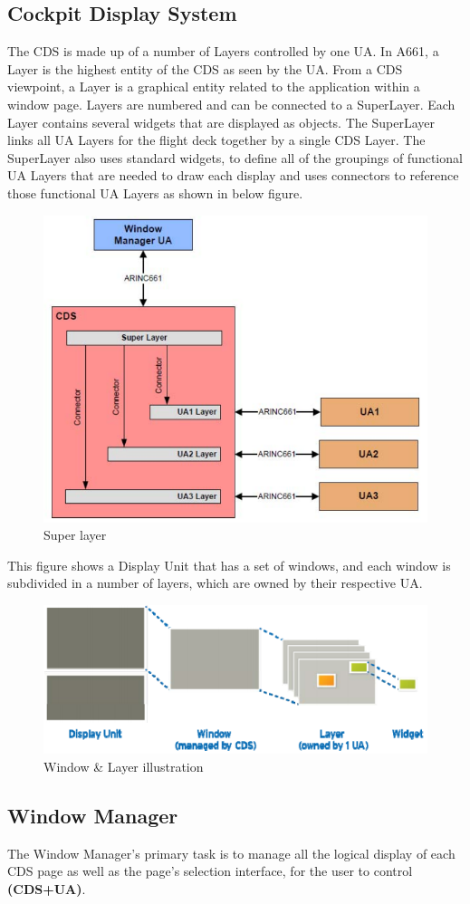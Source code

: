     \subsection{Cockpit Display System}
        The CDS is made up of a number of Layers controlled by one UA. In A661, a Layer is the highest entity of the CDS as seen by 
        the UA. From a CDS viewpoint, a Layer is a graphical entity related to the application within a window page. Layers are numbered 
        and can be connected to a SuperLayer. Each Layer contains several widgets that are displayed as objects. The SuperLayer links all 
        UA Layers for the flight deck together by a single CDS Layer. The SuperLayer also uses standard widgets, to define all of the 
        groupings of functional UA Layers that are needed to draw each display and uses connectors to reference those functional UA 
        Layers as shown in below figure.
        \begin{figure}[H]
            \centering
            \includegraphics[width=0.6\linewidth]{img/SuperLayer.PNG}
            \caption{Super layer}
        \end{figure}
        This figure shows a Display Unit that has a set of windows, and each window is subdivided in a number of layers, which are owned 
        by their respective UA.
        \begin{figure}[H]
            \centering
            \includegraphics[width=0.6\linewidth]{img/window-layer.PNG}
            \caption{Window \& Layer illustration}
        \end{figure}
    \subsection{Window Manager}
        The Window Manager’s primary task is to manage all the logical display of each CDS page as well as the page’s selection interface, 
        for the user to control \textbf{(CDS+UA)}.


